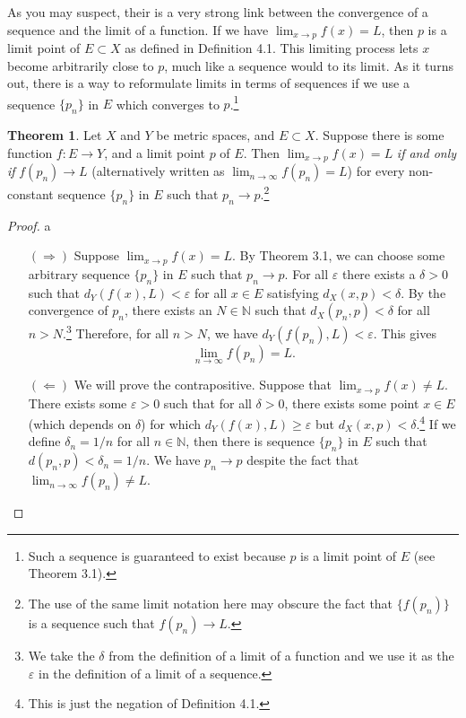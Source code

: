 \documentclass{article}
\newcommand{\N}{\mathbb{N}}
\theoremstyle{definition}
\newtheorem{theorem}{Theorem}[section]
\begin{document}
As you may suspect, their is a very strong link between the convergence of a sequence and the limit of a function. If we have $ \lim_{x\to p}f(x)=L $, then $ p $ is a limit point of $ E\subset X $ as defined in Definition 4.1. This limiting process lets $ x $ become arbitrarily close to $ p $, much like a sequence would to its limit. As it turns out, there is a way to reformulate limits in terms of sequences if we use a sequence $ \{p_n\} $ in $ E $ which converges to $ p $.\footnote{Such a sequence is guaranteed to exist because $ p $ is a limit point of $ E $ (see Theorem 3.1).}
\begin{theorem}
	Let $ X $ and $ Y $ be metric spaces, and $ E\subset X $. Suppose there is some function $ f:E\to Y $, and a limit point $ p $ of $ E $. Then $ \lim_{x\to p}f(x)=L $ \textit{if and only if} $ f(p_n)\to L $ (alternatively written as $ \lim_{n\to\infty}f(p_n)=L $) for every non-constant sequence $ \{p_n\} $ in $ E $ such that $ p_n\to p $.\footnote{The use of the same limit notation here may obscure the fact that $ \{f(p_n)\} $ is a sequence such that $ f(p_n)\to L $. } 
\end{theorem} 
\begin{proof}
	{\color{white}a}
	\begin{enumerate}
		\item [$ (\Longrightarrow) $] Suppose $ \lim_{x\to p}f(x)=L $. By Theorem 3.1, we can choose some arbitrary sequence $ \{p_n\} $ in $ E $ such that $ p_n\to p $. For all $ \varepsilon $ there exists a $ \delta>0 $ such that $ d_Y(f(x),L)<\varepsilon$ for all $ x\in E $ satisfying $ d_X(x,p)<\delta $. By the convergence of $ p_n $, there exists an $ N\in\N $ such that $ d_X(p_n,p)<\delta $ for all $ n>N $.\footnote{We take the $ \delta $ from the definition of a limit of a function and we use it as the $ \varepsilon $ in the definition of a limit of a sequence.} Therefore, for all $ n>N $, we have $d_Y(f(p_n),L)<\varepsilon$. This gives $$\lim_{n\to\infty}f(p_n)=L .$$
		\item [$ (\Longleftarrow) $] We will prove the contrapositive. Suppose that $ \lim_{x\to p}f(x)\neq L $. There exists some $ \varepsilon>0 $ such that for all $ \delta>0 $, there exists some point $ x\in E $ (which depends on $ \delta $) for which $ d_Y(f(x),L)\ge\varepsilon $ but $ d_X(x,p)<\delta $.\footnote{This is just the negation of Definition 4.1.} If we define $ \delta_n=1/n $ for all $ n\in\N $, then there is sequence $ \{p_n\} $ in $ E $ such that $ d(p_n,p)<\delta_n=1/n $. We have $ p_n\to p $ despite the fact that $ \lim_{n\to\infty}f(p_n)\neq L $. 
	\end{enumerate}
\end{proof}
\end{document}
